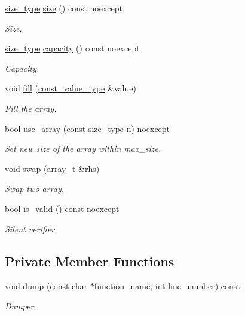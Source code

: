 \begin{DoxyCompactItemize}
\hyperlink{classatom_1_1array__t_a8534f23c7f0082698cbd708e1f2e26ff}{size\+\_\+type} \hyperlink{classatom_1_1array__t_ab399c935e3103360bcd3aacd79d3bd06}{size} () const noexcept
\begin{DoxyCompactList}\small\item\em Size. \end{DoxyCompactList}\item 
\hyperlink{classatom_1_1array__t_a8534f23c7f0082698cbd708e1f2e26ff}{size\+\_\+type} \hyperlink{classatom_1_1array__t_a83235683c8ca9bceb07d050ae1efe767}{capacity} () const noexcept
\begin{DoxyCompactList}\small\item\em Capacity. \end{DoxyCompactList}\item 
void \hyperlink{classatom_1_1array__t_a3062d6888dd690495402b2dadbafe727}{fill} (\hyperlink{classatom_1_1array__t_a9c33ee3fb4e5b4d57c7801a8f69ada14}{const\+\_\+value\+\_\+type} \&value)
\begin{DoxyCompactList}\small\item\em Fill the array. \end{DoxyCompactList}\item 
bool \hyperlink{classatom_1_1array__t_a44737f61d6cac6e2a65fbee06b702755}{use\+\_\+array} (const \hyperlink{classatom_1_1array__t_a8534f23c7f0082698cbd708e1f2e26ff}{size\+\_\+type} n) noexcept
\begin{DoxyCompactList}\small\item\em Set new size of the array within max\+\_\+size. \end{DoxyCompactList}\item 
void \hyperlink{classatom_1_1array__t_a139e38b7e830dc58885a768fe135dee5}{swap} (\hyperlink{classatom_1_1array__t}{array\+\_\+t} \&rhs)
\begin{DoxyCompactList}\small\item\em Swap two array. \end{DoxyCompactList}\item 
bool \hyperlink{classatom_1_1array__t_a6a069628b26cc592466475ec97ff362a}{is\+\_\+valid} () const noexcept
\begin{DoxyCompactList}\small\item\em Silent verifier. \end{DoxyCompactList}\end{DoxyCompactItemize}
\subsection*{Private Member Functions}
\begin{DoxyCompactItemize}
\item 
void \hyperlink{classatom_1_1array__t_a3e133e59958e8638b0f6d7a74b9890d6}{dump} (const char $\ast$function\+\_\+name, int line\+\_\+number) const
\begin{DoxyCompactList}\small\item\em Dumper. \end{DoxyCompactList}\end{DoxyCompactItemize}
